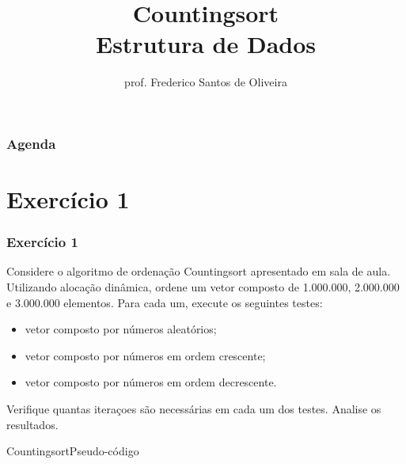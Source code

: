 \documentclass{beamer}
\title[Aula Prática Algoritmos de Ordenação]{Countingsort\\
   Estrutura de Dados}
\author[Frederico Santos de Oliveira]{prof. Frederico Santos de Oliveira}
\institute[UFMT]{Universidade Federal de Mato Grosso\\ Instituto de Engenharia}
\date{}
\begin{document}
\begin{frame}[plain]
  \titlepage
\end{frame}


\begin{frame}
  \frametitle{Agenda}
  \tableofcontents
\end{frame}


\section{Exercício 1}

\begin{frame}
\frametitle{Exercício 1}
Considere o algoritmo de ordenação Countingsort apresentado em sala de aula. Utilizando alocação dinâmica, ordene um vetor composto de 1.000.000, 2.000.000 e 3.000.000 elementos. Para cada um, execute os seguintes testes:
\begin{itemize}
 \item vetor composto por números aleatórios;
 \item vetor composto por números em ordem crescente;
 \item vetor composto por números em ordem decrescente.
\end{itemize} 
Verifique quantas iteraçoes são necessárias em cada um dos testes. Analise os resultados.
\end{frame}



\begin{frame}{Countingsort}{Pseudo-código}
\end{frame}
\end{document}
